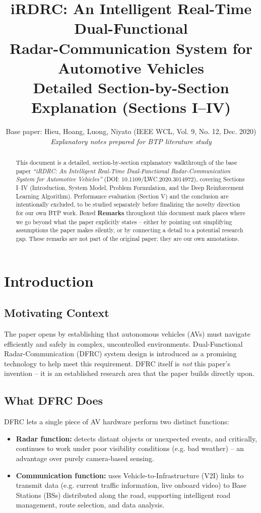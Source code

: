 \documentclass[11pt]{article}
\title{\textbf{iRDRC: An Intelligent Real-Time Dual-Functional \\
Radar-Communication System for Automotive Vehicles} \\
\large Detailed Section-by-Section Explanation (Sections I--IV)}
\author{Base paper: Hieu, Hoang, Luong, Niyato (IEEE WCL, Vol. 9, No. 12, Dec. 2020) \\
\textit{Explanatory notes prepared for BTP literature study}}
\date{}
\begin{document}
\maketitle

\begin{abstract}
\noindent This document is a detailed, section-by-section explanatory walkthrough of the
base paper \emph{``iRDRC: An Intelligent Real-Time Dual-Functional Radar-Communication
System for Automotive Vehicles''} (DOI: 10.1109/LWC.2020.3014972), covering Sections
I--IV (Introduction, System Model, Problem Formulation, and the Deep Reinforcement
Learning Algorithm). Performance evaluation (Section V) and the conclusion are
intentionally excluded, to be studied separately before finalizing the novelty direction
for our own BTP work. Boxed \textbf{Remarks} throughout this document mark places where
we go beyond what the paper explicitly states -- either by pointing out simplifying
assumptions the paper makes silently, or by connecting a detail to a potential research
gap. These remarks are not part of the original paper; they are our own annotations.
\end{abstract}

\tableofcontents

\section{Introduction}

\subsection{Motivating Context}
The paper opens by establishing that autonomous vehicles (AVs) must navigate efficiently
and safely in complex, uncontrolled environments. Dual-Functional Radar-Communication
(DFRC) system design is introduced as a promising technology to help meet this
requirement. DFRC itself is \emph{not} this paper's invention -- it is an established
research area that the paper builds directly upon.

\subsection{What DFRC Does}
DFRC lets a single piece of AV hardware perform two distinct functions:

\begin{itemize}[leftmargin=1.5em]
    \item \textbf{Radar function:} detects distant objects or unexpected events, and
    critically, continues to work under poor visibility conditions (e.g. bad weather) --
    an advantage over purely camera-based sensing.
    \item \textbf{Communication function:} uses Vehicle-to-Infrastructure (V2I) links to
    transmit data (e.g. current traffic information, live onboard video) to Base
    Stations (BSs) distributed along the road, supporting intelligent road management,
    route selection, and data analysis.
\end{itemize}
\end{document}
